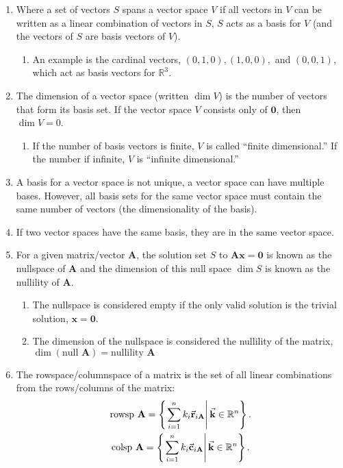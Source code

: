 \documentclass[12pt]{article}
\newcommand{\mat}[1]{\mathbf{#1}}
\newcommand{\rowsp}{\text{rowsp }}
\newcommand{\colsp}{\text{colsp }}
\newcommand{\set}[2]{\left\{\left.#1\right|#2\right\}}
\begin{document}
\begin{enumerate}
\item Where a set of vectors $S$ spans a vector space $V$ if all vectors in $V$ can be written as a linear combination of vectors in $S$, $S$ acts as a basis for $V$ (and the vectors of $S$ are basis vectors of $V$).
\begin{enumerate}
\item An example is the cardinal vectors, $(0,1,0), (1,0,0),$ and $(0,0,1)$, which act as basis vectors for $\mathbb{R}^{3}$.
\end{enumerate}
\item The dimension of a vector space (written $\dim V$) is the number of vectors that form its basis set. If the vector space $V$ consists only of $\mat{0}$, then $\dim V = 0$.
\begin{enumerate}
\item If the number of basis vectors is finite, $V$ is called ``finite dimensional.'' If the number if infinite, $V$ is ``infinite dimensional.''
\end{enumerate}
\item A basis for a vector space is not unique, a vector space can have multiple bases. However, all basis sets for the same vector space must contain the same number of vectors (the dimensionality of the basis).
\item If two vector spaces have the same basis, they are in the same vector space.
\item For a given matrix/vector $\mat{A}$, the solution set $S$ to $\mat{Ax=0}$ is known as the nullspace of $\mat{A}$ and the dimension of this null space $\dim S$ is known as the nullility of $\mat{A}$.
\begin{enumerate}
\item The nullspace is considered empty if the only valid solution is the trivial solution, $\mat{x=0}$.
\item The dimension of the nullspace is considered the nullility of the matrix, $\dim (\text{null } \mat{A}) = \text{nullility } \mat{A}$
\end{enumerate}
\item The rowspace/columnspace of a matrix is the set of all linear combinations from the rows/columns of the matrix:
\begin{gather}
\rowsp \mat{A} = \set{ \sum_{i=1}^{n} k_{i} \va{r}_{i\mat{A}} }{ \va{k} \in \mathbb{R}^{n} }. \\
\colsp \mat{A} = \set{ \sum_{i=1}^{n} k_{i} \va{c}_{i\mat{A}} }{ \va{k} \in \mathbb{R}^{n} }.

\end{gather}
\end{enumerate}
\end{document}
